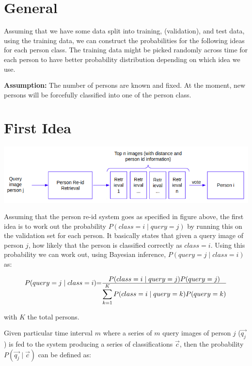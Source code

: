 \documentclass[10pt,a4paper,final]{article}
\begin{document}
\section{General}

Assuming that we have some data split into training, (validation), and test data, using the training data, we can construct the probabilities for the following ideas for each person class. The training data might be picked randomly across time for each person to have better probability distribution depending on which idea we use.

\textbf{Assumption:} The number of persons are known and fixed. At the moment, new persons will be forcefully classified into one of the person class.

\section{First Idea}

\includegraphics[width=\textwidth]{figures/first_idea.png}

Assuming that the person re-id system goes as specified in figure above, the first idea is to work out the probability $P(class = i \mid query = j)$ by running this on the validation set for each person. It basically states that given a query image of person $j$, how likely that the person is classified correctly as $class = i$. Using this probability we can work out, using Bayesian inference, $P(query=j \mid class=i)$ as:

\begin{equation}
	\label{eq:first_idea}
	\begin{tabular}{r@{=}l}
		$P(query=j \mid class=i)$ & $\frac{\displaystyle P(class = i \mid query = j) P(query=j)}{\displaystyle\sum_{k=1}^{K} P(class = i \mid query = k) P(query=k)}$ \\ 
	\end{tabular}
\end{equation}

\noindent with $K$ the total persons. 

Given particular time interval $m$ where a series of $m$ query images of person $j$ ($\overrightarrow{q_j}$) is fed to the system producing a series of classifications $\overrightarrow{c}$, then the probability $P(\overrightarrow{q_j} \mid \overrightarrow{c})$ can be defined as:
\end{document}
